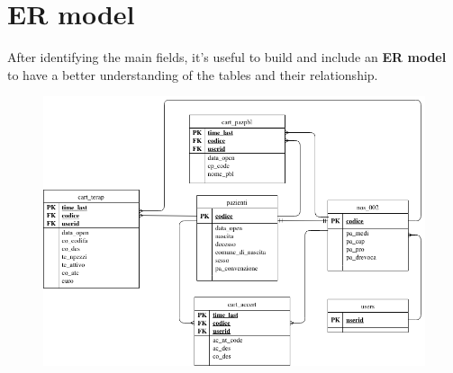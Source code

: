 \section{ER model}
After identifying the main fields, it's useful to build and include an \textbf{ER model}\cite{draw} to have a better understanding of the tables and their relationship.
\begin{figure}[h]
	\centering
	\includegraphics[scale=0.6]{immagini/er.png}
\end{figure}

